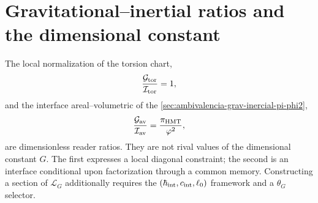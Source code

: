 \section{Gravitational--inertial ratios and the dimensional constant}
\label{sec:razones-no-rivales-G}

The local normalization of the torsion chart,
\[
 \frac{\mathcal G_{\rm tor}}{\mathcal I_{\rm tor}}=1,
\]
and the interface areal--volumetric of the
\cref{sec:ambivalencia-grav-inercial-pi-phi2},
\[
 \frac{\mathcal G_{\rm av}}{\mathcal I_{\rm av}}
 =\frac{\pi_{\rm HMT}}{\varphi^{2}},
\]
are dimensionless reader ratios. They are not rival values of the
dimensional constant \(G\). The first expresses a local diagonal
constraint; the second is an interface conditional upon factorization through a
common memory. Constructing a section of
\(\mathcal L_G\) additionally requires the
\((\hbar_{\rm int},c_{\rm int},\ell_0)\) framework and a
\(\theta_G\) selector.
